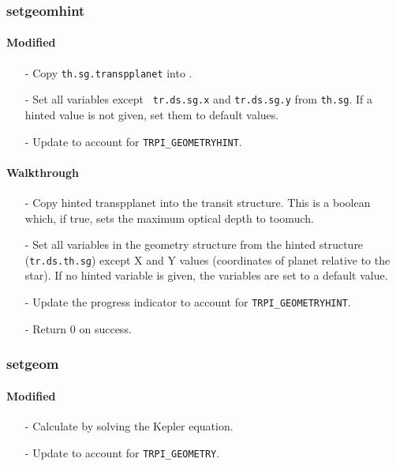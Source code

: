 \documentclass[letterpaper,12pt]{article}
\begin{document}
 \newline

\subsubsection{setgeomhint}
\paragraph{Modified}
\begin{enumerate}[leftmargin=10pt, noitemsep, parsep=0pt, topsep=0ex]
\item[-] Copy {\tt th.sg.transpplanet} into .
\item[-] Set all  variables except {\tt
    tr.ds.sg.x} and {\tt tr.ds.sg.y} from {\tt th.sg}. If a hinted value is not given, set them to default values.
\item[-] Update  to account for {\tt TRPI\_GEOMETRYHINT}.
\end{enumerate}

\paragraph{Walkthrough}
\begin{enumerate}[leftmargin=10pt, noitemsep, parsep=0pt, topsep=0ex]
\item[-] Copy hinted transpplanet into the transit structure. This is a boolean which, if true, sets the maximum optical depth to toomuch.
\item[-] Set all variables in the geometry structure from the hinted structure ({\tt tr.ds.th.sg}) except X and Y values (coordinates of planet relative to the star). If no hinted variable is given, the variables are set to a default value.
\item[-] Update the progress indicator to account for {\tt TRPI\_GEOMETRYHINT}.
\item[-] Return 0 on success.
\end{enumerate}

\subsubsection{setgeom}
\paragraph{Modified}
\begin{enumerate}[leftmargin=10pt, noitemsep, parsep=0pt, topsep=0ex]
\item[-] Calculate  by solving the Kepler equation.
\item[-] Update  to account for {\tt TRPI\_GEOMETRY}.
\end{enumerate}
\end{document}
